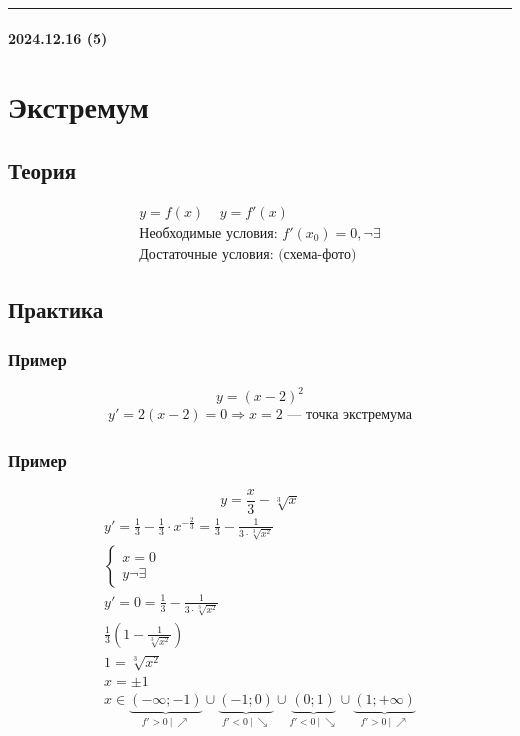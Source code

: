 \documentclass{article}
\begin{document}
\par\noindent\rule{\textwidth}{1pt}
\paragraph{2024.12.16 (5)}
\section{Экстремум}

\subsection{Теория}
\begin{gather*}
    y = f(x) ~~~~~ y = f'(x) \\
    \text{Необходимые условия: } f'(x_0) = 0, \neg \exists \\
    \text{Достаточные условия: (схема-фото)} 
\end{gather*}



\subsection{Практика}

\subsubsection{Пример}
\[
    y = (x - 2)^2
\]
\begin{gather*}
    y' = 2(x - 2) = 0 \Rightarrow x = 2 \text{ --- точка экстремума}
\end{gather*}

\subsubsection{Пример}
\[
    y = \frac{x}{3} - \sqrt[3]{x}
\]
\begin{gather*}
    y' = \frac{1}{3} - \frac{1}{3} \cdot x^{-\frac{2}{3}} =
    \frac{1}{3} - \frac{1}{3 \cdot \sqrt[3]{x^2}} \\
    \begin{cases}
        x = 0 \\
        y \neg \exists
    \end{cases} \\
    y' = 0 = \frac{1}{3} - \frac{1}{3 \cdot \sqrt[3]{x^2}} \\
    \frac{1}{3} \left( 1 - \frac{1}{\sqrt[3]{x^2}} \right) \\
    1 = \sqrt[3]{x^2} \\
    x = \pm 1 \\
    x \in \underbrace{(-\infty; -1)}_{f' > 0 ~|~ \nearrow} \cup \underbrace{(-1; 0)}_{f' < 0 ~|~ \searrow} \cup \underbrace{(0; 1)}_{f' < 0 ~|~ \searrow} \cup \underbrace{(1; +\infty)}_{f' > 0 ~|~ \nearrow}
\end{gather*}
\end{document}
